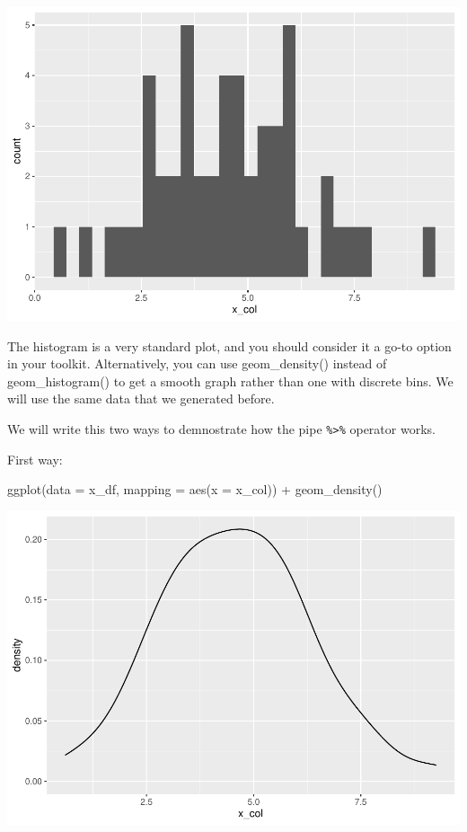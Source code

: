 \documentclass[
]{book}
\newenvironment{Shaded}{\begin{snugshade}}{\end{snugshade}}
\newcommand{\AttributeTok}[1]{\textcolor[rgb]{0.77,0.63,0.00}{#1}}
\newcommand{\FunctionTok}[1]{\textcolor[rgb]{0.00,0.00,0.00}{#1}}
\newcommand{\NormalTok}[1]{#1}
\newcommand{\SpecialCharTok}[1]{\textcolor[rgb]{0.00,0.00,0.00}{#1}}
\begin{document}
\includegraphics{test_course_notes_files/figure-latex/ggplot-hist-1.pdf}

The histogram is a very standard plot, and you should consider it a go-to option in your toolkit. Alternatively, you can use geom\_density() instead of geom\_histogram() to get a smooth graph rather than one with discrete bins. We will use the same data that we generated before.

We will write this two ways to demnostrate how the pipe \texttt{\%\textgreater{}\%} operator works.

First way:

\begin{Shaded}
\begin{Highlighting}[]
\FunctionTok{ggplot}\NormalTok{(}\AttributeTok{data =}\NormalTok{ x\_df, }\AttributeTok{mapping =} \FunctionTok{aes}\NormalTok{(}\AttributeTok{x =}\NormalTok{ x\_col)) }\SpecialCharTok{+}
  \FunctionTok{geom\_density}\NormalTok{()}
\end{Highlighting}
\end{Shaded}

\includegraphics{test_course_notes_files/figure-latex/unnamed-chunk-26-1.pdf}
\end{document}
